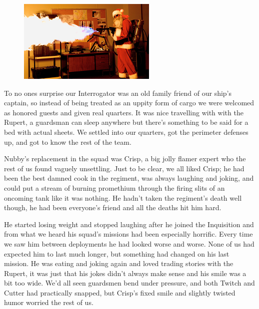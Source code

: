 \begin{figure}
	\begin{center}
		\includegraphics[width=\figwidth]{pics/6/3.png}
	\end{center}
\end{figure}
To no ones surprise our Interrogator was an old family friend of our ship's captain, so instead of being treated as an uppity form of cargo we were welcomed as honored guests and given real quarters. 
It was nice travelling with with the Rupert, a guardsman can sleep anywhere but there's something to be said for a bed with actual sheets. 
We settled into our quarters, got the perimeter defenses up, and got to know the rest of the team.

Nubby's replacement in the squad was Crisp, a big jolly flamer expert who the rest of us found vaguely unsettling. 
Just to be clear, we all liked Crisp; he had been the best damned cook in the regiment, was always laughing and joking, and could put a stream of burning promethium through the firing slits of an oncoming tank like it was nothing. 
He hadn't taken the regiment's death well though, he had been everyone's friend and all the deaths hit him hard. 

He started losing weight and stopped laughing after he joined the Inquisition and from what we heard his squad's missions had been especially horrific. 
Every time we saw him between deployments he had looked worse and worse. 
None of us had expected him to last much longer, but something had changed on his last mission. 
He was eating and joking again and loved trading stories with the Rupert, it was just that his jokes didn't always make sense and his smile was a bit too wide. 
We'd all seen guardsmen bend under pressure, and both Twitch and Cutter had practically snapped, but Crisp's fixed smile and slightly twisted humor worried the rest of us.

